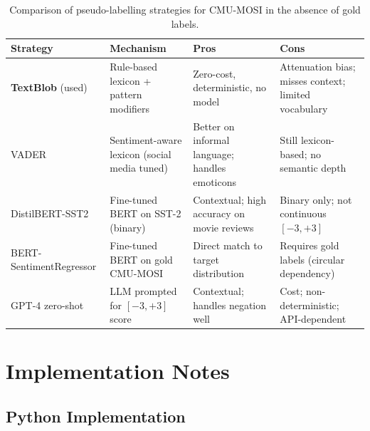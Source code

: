 \documentclass[12pt,a4paper]{article}
\theoremstyle{plain}
\theoremstyle{definition}
\begin{document}
\begin{table}[H]
\centering
\caption{Comparison of pseudo-labelling strategies for CMU-MOSI
         in the absence of gold labels.}
\label{tab:strategies}
\begin{tabularx}{\textwidth}{lXXX}
\toprule
Strategy & Mechanism & Pros & Cons \\
\midrule
\textbf{TextBlob} (used) &
  Rule-based lexicon + pattern modifiers &
  Zero-cost, deterministic, no model &
  Attenuation bias; misses context; limited vocabulary \\
\addlinespace
VADER &
  Sentiment-aware lexicon (social media tuned) &
  Better on informal language; handles emoticons &
  Still lexicon-based; no semantic depth \\
\addlinespace
DistilBERT-SST2 &
  Fine-tuned BERT on SST-2 (binary) &
  Contextual; high accuracy on movie reviews &
  Binary only; not continuous $[-3,+3]$ \\
\addlinespace
BERT-SentimentRegressor &
  Fine-tuned BERT on gold CMU-MOSI &
  Direct match to target distribution &
  Requires gold labels (circular dependency) \\
\addlinespace
GPT-4 zero-shot &
  LLM prompted for $[-3,+3]$ score &
  Contextual; handles negation well &
  Cost; non-deterministic; API-dependent \\
\bottomrule
\end{tabularx}
\end{table}

\section{Implementation Notes}
\label{sec:impl}

\subsection{Python Implementation}
\end{document}
